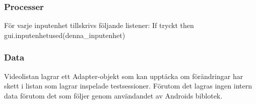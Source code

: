 \subsubsection{Processer}
För varje inputenhet tillskrivs följande listener:
If tryckt
then gui.inputenhetused(denna_inputenhet)

\subsubsection{Data}
Videolistan lagrar ett Adapter-objekt som kan upptäcka om förändringar har skett i listan som lagrar inspelade testsessioner. Förutom det lagras ingen intern data förutom det som följer genom användandet av Androids biblotek.
